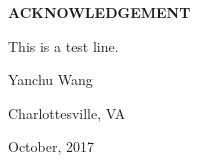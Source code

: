 \begin{center}
\textbf{\huge ACKNOWLEDGEMENT}
\end{center}
\vspace{0.5cm}

This is a test line.

\vspace{0.5cm}
\begin{flushleft}
Yanchu Wang

Charlottesville, VA

October, 2017
\end{flushleft}
